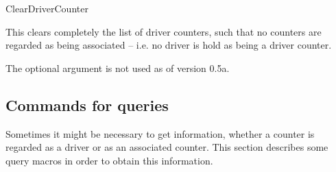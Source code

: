 \documentclass[12pt,paper=a4]{ltxdoc}
\def\packageversion{0.5a}%
\begin{document}
\begin{docCommand}{ClearDriverCounter}{}%

This clears completely the list of driver counters, such that no counters are regarded as being associated -- i.e. no driver is hold as being a driver counter.

The optional argument is not used as of version \packageversion. 

\end{docCommand}


\subsection{Commands for queries}

Sometimes it might be necessary to get information, whether a counter is regarded as a driver or as an associated counter. This section describes some query macros in order to obtain this information.
\end{document}
